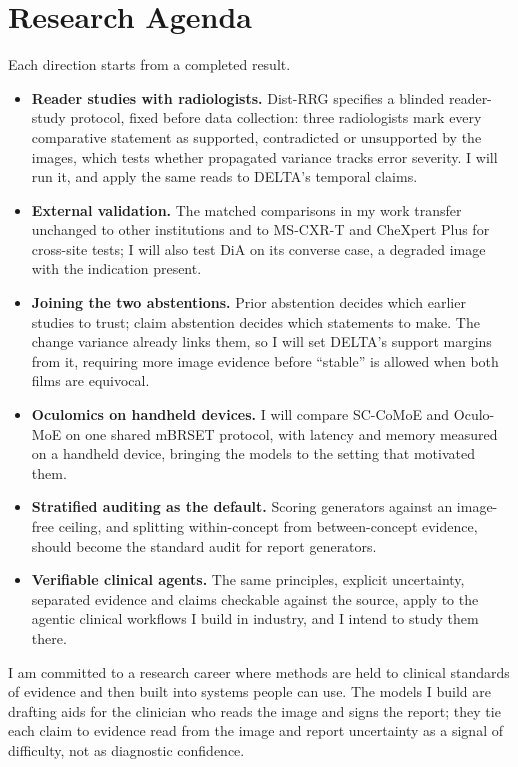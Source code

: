 \documentclass[10pt,letterpaper]{article}
\begin{document}
\section{Research Agenda}
Each direction starts from a completed result.
\begin{itemize}
\item \textbf{Reader studies with radiologists.} Dist-RRG specifies a blinded reader-study protocol, fixed before data collection: three radiologists mark every comparative statement as supported, contradicted or unsupported by the images, which tests whether propagated variance tracks error severity. I will run it, and apply the same reads to DELTA's temporal claims.
\item \textbf{External validation.} The matched comparisons in my work transfer unchanged to other institutions and to MS-CXR-T and CheXpert Plus for cross-site tests; I will also test DiA on its converse case, a degraded image with the indication present.
\item \textbf{Joining the two abstentions.} Prior abstention decides which earlier studies to trust; claim abstention decides which statements to make. The change variance already links them, so I will set DELTA's support margins from it, requiring more image evidence before ``stable'' is allowed when both films are equivocal.
\item \textbf{Oculomics on handheld devices.} I will compare SC-CoMoE and Oculo-MoE on one shared mBRSET protocol, with latency and memory measured on a handheld device, bringing the models to the setting that motivated them.
\item \textbf{Stratified auditing as the default.} Scoring generators against an image-free ceiling, and splitting within-concept from between-concept evidence, should become the standard audit for report generators.
\item \textbf{Verifiable clinical agents.} The same principles, explicit uncertainty, separated evidence and claims checkable against the source, apply to the agentic clinical workflows I build in industry, and I intend to study them there.
\end{itemize}
I am committed to a research career where methods are held to clinical standards of evidence and then built into systems people can use. The models I build are drafting aids for the clinician who reads the image and signs the report; they tie each claim to evidence read from the image and report uncertainty as a signal of difficulty, not as diagnostic confidence.
\end{document}
